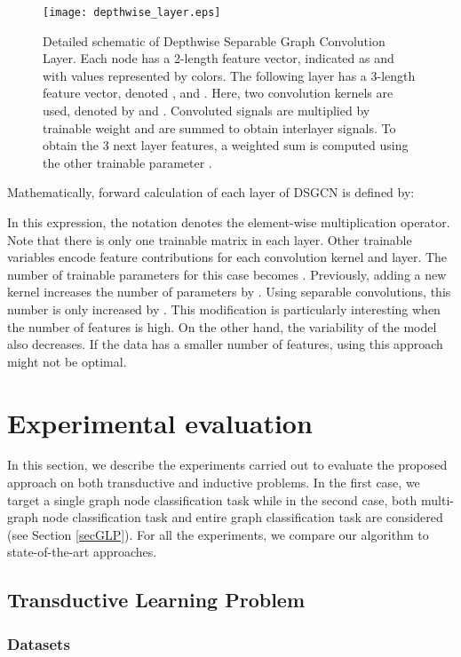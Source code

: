 \documentclass{article}
\begin{document}
\begin{figure}[t]
\centering
 \texttt{[image: depthwise\_layer.eps]}
 \caption{Detailed schematic of Depthwise Separable Graph Convolution Layer. Each node has a 2-length feature vector, indicated as  and  with values represented by colors. The following layer has a 3-length feature vector, denoted ,  and . Here, two convolution kernels are used, denoted by  and . Convoluted signals are multiplied by trainable weight  and are summed to obtain interlayer signals.  To obtain the 3 next layer features, a weighted sum is computed using the other trainable parameter .
}
 \label{fig:depthwise_layer}
 \medskip
\end{figure}


Mathematically, forward calculation of  each layer of DSGCN is defined by: 

In this expression, the notation   denotes the element-wise multiplication operator. Note that there is only one trainable matrix  in each layer. Other trainable variables 
encode feature contributions for each convolution kernel 
and layer. The number of trainable parameters for this case becomes . Previously, adding a new kernel  increases the number of parameters by . Using separable convolutions, this number is only increased by
. This modification is particularly interesting when the number of features is high. On the other hand, the variability of the model also decreases. If the data has a smaller number of features, using this approach might not be optimal.

\section{Experimental evaluation}
\label{sec:xp}


In this section, we describe the experiments carried out to evaluate the proposed approach on both transductive and inductive problems. In the first case, we target a single graph node classification task while in the second case, both multi-graph node classification task and entire graph classification task are considered (see Section \ref{secGLP}). For all the experiments, we compare our algorithm to state-of-the-art approaches. 


\subsection{Transductive Learning Problem}

\subsubsection{Datasets} 
\end{document}
